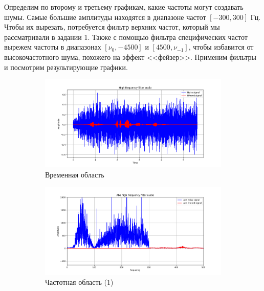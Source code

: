 \documentclass[a4paper, 12pt]{article}
\begin{document}
    
    Определим по второму и третьему графикам, какие частоты могут создавать шумы.
    Самые большие амплитуды находятся в диапазоне частот $[-300,300]$ Гц. Чтобы их вырезать, потребуется фильтр верхних частот, который
    мы рассматривали в задании 1. Также с помощью фильтра специфических частот
    вырежем частоты в диапазонах $[\nu_{0},-4500]$ и $[4500,\nu_{-1}]$, чтобы избавится от высокочастотного шума, похожего на эффект <<фейзер>>.
    Применим фильтры и посмотрим результирующие графики.
    \begin{figure}[H]
        \centering
        \begin{subfigure}{0.45\textwidth}
            \centering
            \includegraphics[width=\linewidth]{faudio.png}
            \caption{Временная область}
            \label{fig:fig113}
        \end{subfigure}
        \hspace{5mm}
        \begin{subfigure}{0.45\textwidth}
            \centering
            \includegraphics[width=\linewidth]{abs_audio.png}
            \caption{Частотная область (1)}
            \label{fig:fig114}
        \end{subfigure}
        \begin{subfigure}{0.45\textwidth}

\end{subfigure}
\end{figure}
\end{document}
